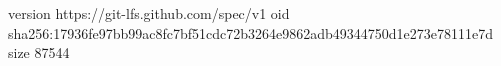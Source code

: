 version https://git-lfs.github.com/spec/v1
oid sha256:17936fe97bb99ac8fc7bf51cdc72b3264e9862adb49344750d1e273e78111e7d
size 87544
